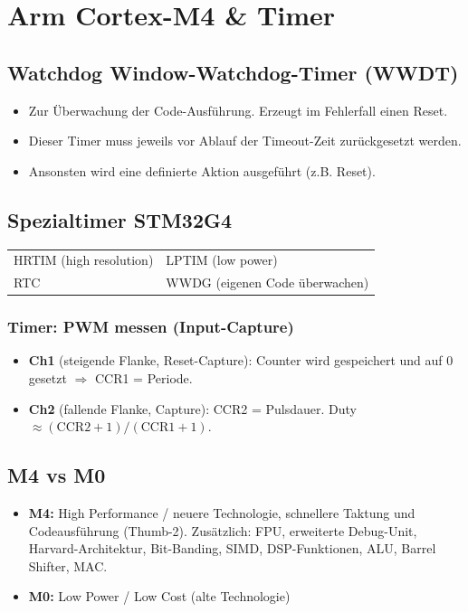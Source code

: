 \section{Arm Cortex-M4 \& Timer}

\subsection{Watchdog Window-Watchdog-Timer (WWDT)}
\begin{itemize}
    \item Zur Überwachung der Code-Ausführung. Erzeugt im Fehlerfall einen Reset.
    \item Dieser Timer muss jeweils vor Ablauf der Timeout-Zeit zurückgesetzt werden.
    \item Ansonsten wird eine definierte Aktion ausgeführt (z.B. Reset).
\end{itemize}

\subsection{Spezialtimer STM32G4}
\begin{tabularx}{\columnwidth}{XX}
    HRTIM (high resolution) & LPTIM (low power)\\
    RTC & WWDG (eigenen Code überwachen)
\end{tabularx}

\subsubsection{Timer: PWM messen (Input-Capture)}
\begin{itemize}
    \item \textbf{Ch1} (steigende Flanke, Reset-Capture): Counter wird gespeichert und auf $0$ gesetzt $\Rightarrow$ \textcolor{orange!80!black}{CCR1} = Periode.
    \item \textbf{Ch2} (fallende Flanke, Capture): \textcolor{blue!70!black}{CCR2} = Pulsdauer. Duty $\approx (\mathrm{CCR2}+1)/(\mathrm{CCR1}+1)$.
\end{itemize}
\begin{center}\end{center}
\vspace{-1.2em}

\subsection{M4 vs M0}
\begin{itemize}
    \item \textbf{M4:} High Performance / neuere Technologie, schnellere Taktung und Codeausführung (Thumb-2). Zusätzlich: FPU, erweiterte Debug-Unit, Harvard-Architektur, Bit-Banding, SIMD, DSP-Funktionen, ALU, Barrel Shifter, MAC.
    \item \textbf{M0:} Low Power / Low Cost (alte Technologie)
\end{itemize}

